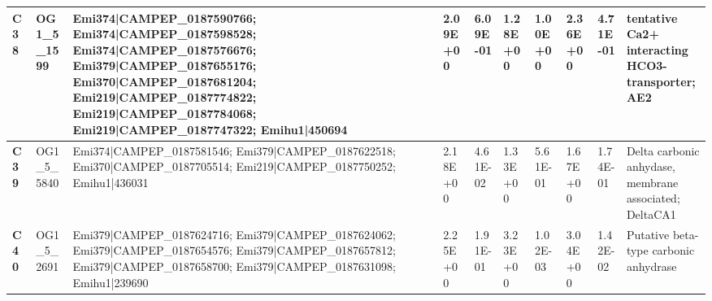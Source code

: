 \begin{landscape}
\begin{center}
\begin{footnotesize}
\begin{longtable}{|p{0.5cm}|p{1.5cm}|p{4cm}|l|l|l|l|l|l|l|}
\textbf{C38} & OG1\_5\_1599  & Emi374|CAMPEP\_0187590766; Emi374|CAMPEP\_0187598528; Emi374|CAMPEP\_0187576676; Emi379|CAMPEP\_0187655176; Emi370|CAMPEP\_0187681204; Emi219|CAMPEP\_0187774822; Emi219|CAMPEP\_0187784068; Emi219|CAMPEP\_0187747322; Emihu1|450694                                                                                                                                                                                                                                                                                                                                                                                                    & 2.09E+00  & 6.09E-01 & 1.28E+00  & 1.00E+00 & 2.36E+00  & 4.71E-01 & tentative Ca2+ interacting HCO3-transporter; AE2                             \\ \hline
\textbf{C39} & OG1\_5\_5840  & Emi374|CAMPEP\_0187581546; Emi379|CAMPEP\_0187622518; Emi370|CAMPEP\_0187705514; Emi219|CAMPEP\_0187750252; Emihu1|436031                                                                                                                                                                                                                                                                                                                                                                                                                                                                                                                & 2.18E+00  & 4.61E-02 & 1.33E+00  & 5.61E-01 & 1.67E+00  & 1.74E-01 & Delta carbonic anhydase, membrane associated; DeltaCA1                       \\ \hline
\textbf{C40} & OG1\_5\_2691  & Emi379|CAMPEP\_0187624716; Emi379|CAMPEP\_0187624062; Emi379|CAMPEP\_0187654576; Emi379|CAMPEP\_0187657812; Emi379|CAMPEP\_0187658700; Emi379|CAMPEP\_0187631098; Emihu1|239690                                                                                                                                                                                                                                                                                                                                                                                                                                                          & 2.25E+00  & 1.91E-01 & 3.23E+00  & 1.02E-03 & 3.04E+00  & 1.42E-02 & Putative beta-type carbonic anhydrase                                        \\ \hline

\end{longtable}
\end{footnotesize}
\end{center}
\end{landscape}
